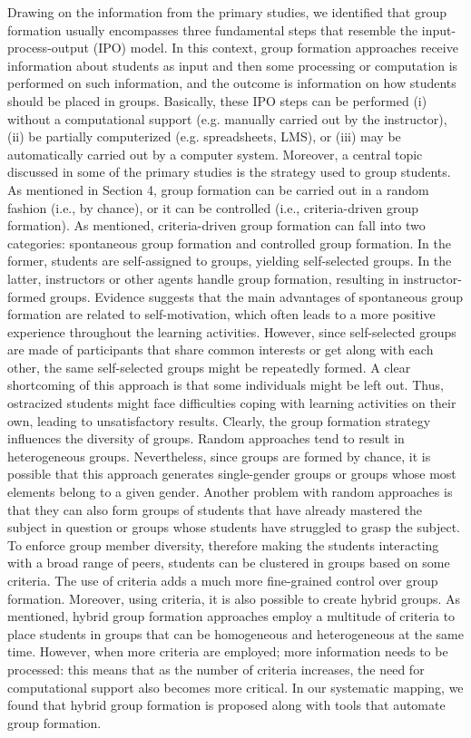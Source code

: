 Drawing on the information from the primary studies, we identified that group formation usually encompasses three fundamental steps that resemble the input-process-output (IPO) model. In this context, group formation approaches receive information about students as input and then some processing or computation is performed on such information, and the outcome is information on how students should be placed in groups. Basically, these IPO steps can be performed (i) without a computational support (e.g. manually carried out by the instructor), (ii) be partially computerized (e.g. spreadsheets, LMS), or (iii) may be automatically carried out by a computer system.
Moreover, a central topic discussed in some of the primary studies is the strategy used to group students. As mentioned in Section 4, group formation can be carried out in a random fashion (i.e., by chance), or it can be controlled (i.e., criteria-driven group formation). As mentioned, criteria-driven group formation can fall into two categories: spontaneous group formation and controlled group formation. In the former, students are self-assigned to groups, yielding self-selected groups. In the latter, instructors or other agents handle group formation, resulting in instructor-formed groups. Evidence suggests that the main advantages of spontaneous group formation are related to self-motivation, which often leads to a more positive experience throughout the learning activities. However, since self-selected groups are made of participants that share common interests or get along with each other, the same self-selected groups might be repeatedly formed. A clear shortcoming of this approach is that some individuals might be left out. Thus, ostracized students might face difficulties coping with learning activities on their own, leading to unsatisfactory results. 
Clearly, the group formation strategy influences the diversity of groups. Random approaches tend to result in heterogeneous groups. Nevertheless, since groups are formed by chance, it is possible that this approach generates single-gender groups or groups whose most elements belong to a given gender. Another problem with random approaches is that they can also form groups of students that have already mastered the subject in question or groups whose students have struggled to grasp the subject. To enforce group member diversity, therefore making the students interacting with a broad range of peers, students can be clustered in groups based on some criteria. The use of criteria adds a much more fine-grained control over group formation. Moreover, using criteria, it is also possible to create hybrid groups. As mentioned, hybrid group formation approaches employ a multitude of criteria to place students in groups that can be homogeneous and heterogeneous at the same time. However, when more criteria are employed; more information needs to be processed: this means that as the number of criteria increases, the need for computational support also becomes more critical. In our systematic mapping, we found that hybrid group formation is proposed along with tools that automate group formation. 
